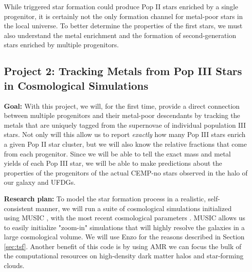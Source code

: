 \documentclass[letterpaper, 12pt]{article}
\begin{document}
While triggered star formation could produce Pop II stars enriched by a single progenitor, it is certainly not the only formation channel for metal-poor stars in the local universe. To better determine the properties of the first stars, we must also understand the metal enrichment and the formation of second-generation stars enriched by multiple progenitors.

\subsection*{Project 2: Tracking Metals from Pop III Stars in Cosmological Simulations}
\label{subsec:tracer_particles}

\textbf{Goal:} With this project, we will, for the first time, provide a direct connection between multiple progenitors and their metal-poor descendants by tracking the metals that are uniquely tagged from the supernovae of individual population III stars. Not only will this allow us to report \textit{exactly} how many Pop III stars enrich a given Pop II star cluster, but we will also know the relative fractions that come from each progenitor. Since we will be able to tell the exact mass and metal yields of each Pop III star, we will be able to make predictions about the properties of the progenitors of the actual CEMP-no stars observed in the halo of our galaxy and UFDGs. 

\textbf{Research plan:} To model the star formation process in a realistic, self-consistent manner, we will run a suite of cosmological simulations initialized using MUSIC \citep{Hahn2011}, with the most recent cosmological parameters \cite{Planck2018}. MUSIC allows us to easily initialize "zoom-in" simulations that will highly resolve the galaxies in a large cosmological volume. We will use Enzo for the reasons described in Section \ref{sec:tsf}. Another benefit of this code is by using AMR we can focus the bulk of the computational resources on high-density dark matter halos and star-forming clouds.
\end{document}
